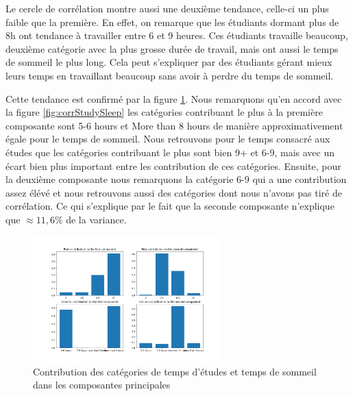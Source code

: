 Le cercle de corrélation montre aussi une deuxième tendance, celle-ci un plus faible que la première.
En effet, on remarque que les étudiants dormant plus de 8h ont tendance à travailler entre 6 et 9 heures.
Ces étudiants travaille beaucoup, deuxième catégorie avec la plus grosse durée de travail, mais ont aussi le temps de sommeil le plus long.
Cela peut s'expliquer par des étudiants gérant mieux leurs temps en travaillant beaucoup sans avoir à perdre du temps de sommeil.


Cette tendance est confirmé par la figure \ref{fig:contribStudySleep}.
Nous remarquons qu'en accord avec la figure \ref{fig:corrStudySleep} les catégories contribuant le plus à la première composante sont 5-6 hours et More than 8 hours de manière approximativement égale pour le temps de sommeil.
Nous retrouvons pour le temps consacré aux études que les catégories contribuant le plus sont bien 9+ et 6-9, mais avec un écart bien plus important entre les contribution de ces catégories.
Ensuite, pour la deuxième composante nous remarquons la catégorie 6-9 qui a une contribution assez élévé et nous retrouvons aussi des catégories dont nous n'avons pas tiré de corrélation.
Ce qui s'explique par le fait que la seconde composante n'explique que $\approx11,6\%$ de la variance.

\begin{figure}[H]
    \begin{center}
      \includegraphics[width=0.65\textwidth]{Images/Study_Sleep_all/RowColumnsContributions.png}
    \end{center}
    \caption{Contribution des catégories de temps d'études et temps de sommeil dans les composantes principales}
    \label{fig:contribStudySleep}
  \end{figure}




